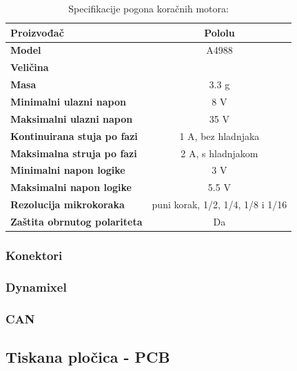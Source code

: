 \documentclass[11pt,a4paper]{article}
\begin{document}
\begin{table}[H]
	\centering
	\caption{Specifikacije pogona koračnih motora: }
	\label{tab:specifikacija_stepper_driver}
	\begin{tabular}{|l|c|}
		\hline
		\textbf{Proizvođač} & Pololu \\ \hline 
		\textbf{Model} & A4988 \\ \hline 
		\textbf{Veličina} &    \\ \hline 
		\textbf{Masa} & 3.3 g \\ \hline 
		\textbf{Minimalni ulazni napon} & 8 V \\ \hline 
		\textbf{Maksimalni ulazni napon} & 35 V \\ \hline 
		\textbf{Kontinuirana stuja po fazi} & 1 A, bez hladnjaka \\ \hline 
		\textbf{Maksimalna struja po fazi} & 2 A, s hladnjakom \\ \hline 
		\textbf{Minimalni napon logike} & 3 V\\ \hline 
		\textbf{Maksimalni napon logike} & 5.5 V\\ \hline 
		\textbf{Rezolucija mikrokoraka} & puni korak, 1/2, 1/4, 1/8 i 1/16\\ \hline 
		\textbf{Zaštita obrnutog polariteta} & Da\\ \hline 
	\end{tabular}
\end{table}


\subsubsection{Konektori}



\subsubsection{Dynamixel}
\subsubsection{CAN}

\subsection{Tiskana pločica - PCB}
\end{document}
